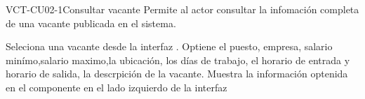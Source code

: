 \begin{UseCase}[]{VCT-CU02-1}{Consultar vacante}{
	Permite al actor consultar la infomación completa de una vacante publicada en el sistema.
}
\end{UseCase}

\begin{UCtrayectoria}
	\UCpaso [\UCactor] Seleciona una vacante desde la interfaz .
	\UCpaso [\UCsist] Optiene el puesto, empresa, salario minímo,salario maximo,la ubicación,
	los días de trabajo, el horario de entrada y horario de salida, la descrpición  de la vacante.
	\UCpaso [\UCsist] Muestra la información optenida en el componente  en el lado izquierdo de la interfaz 
\end{UCtrayectoria}

